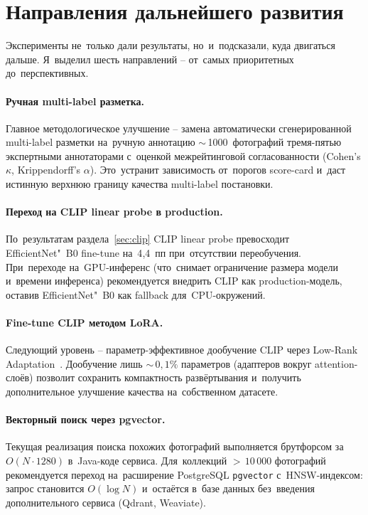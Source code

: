 \documentclass[a4paper,12pt]{diplom}
\begin{document}
\section{Направления дальнейшего развития}
\label{sec:future_work}

Эксперименты не~только дали результаты, но~и~подсказали, куда двигаться дальше. Я~выделил шесть направлений -- от~самых приоритетных до~перспективных.

\paragraph{Ручная multi-label разметка.} Главное методологическое улучшение -- замена автоматически сгенерированной multi-label разметки на~ручную аннотацию $\sim$\,1000~фотографий тремя-пятью экспертными аннотаторами с~оценкой межрейтинговой согласованности (Cohen's $\kappa$, Krippendorff's $\alpha$). Это~устранит зависимость от~порогов score-card и~даст истинную верхнюю границу качества multi-label постановки.

\paragraph{Переход на CLIP linear probe в production.} По~результатам раздела~\ref{sec:clip} CLIP linear probe превосходит EfficientNet"~B0 fine-tune на~4{,}4~пп при~отсутствии переобучения. При~переходе на~GPU-инференс (что~снимает ограничение размера модели и~времени инференса) рекомендуется внедрить CLIP как production-модель, оставив EfficientNet"~B0 как fallback для~CPU-окружений.

\paragraph{Fine-tune CLIP методом LoRA.} Следующий уровень -- параметр-эффективное дообучение CLIP через Low-Rank Adaptation~\cite{Hu:2022}. Дообучение лишь $\sim$\,$0{,}1\%$ параметров (адаптеров вокруг attention-слоёв) позволит сохранить компактность развёртывания и~получить дополнительное улучшение качества на~собственном датасете.

\paragraph{Векторный поиск через pgvector.} Текущая реализация поиска похожих фотографий выполняется брутфорсом за~$O(N \cdot 1280)$ в~Java-коде сервиса. Для~коллекций $>\,10\,000$ фотографий рекомендуется переход на~расширение PostgreSQL \texttt{pgvector} с~HNSW-индексом: запрос становится $O(\log N)$ и~остаётся в~базе данных без~введения дополнительного сервиса (Qdrant, Weaviate).
\end{document}
